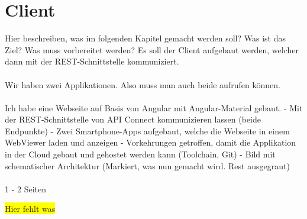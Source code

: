 \chapter{Client}
\label{ch:client}
Hier beschreiben, was im folgenden Kapitel gemacht werden soll? Was ist das Ziel? Was muss vorbereitet werden?
Es soll der Client aufgebaut werden, welcher dann mit der REST-Schnittstelle kommuniziert.
\\ \\
Wir haben zwei Applikationen. Also muss man auch beide aufrufen können.
\\ \\
Ich habe eine Webseite auf Basis von Angular mit Angular-Material gebaut. - Mit der REST-Schnittstelle von API Connect
kommunizieren lassen (beide Endpunkte) - Zwei Smartphone-Apps aufgebaut,
welche die Webseite in einem WebViewer laden und anzeigen - Vorkehrungen getroffen, damit die Applikation in der Cloud
gebaut und gehostet werden kann (Toolchain, Git) - Bild mit schematischer Architektur (Markiert, was nun gemacht wird.
Rest ausgegraut)
\\ \\
1 - 2 Seiten

\colorbox{yellow}{Hier fehlt was}